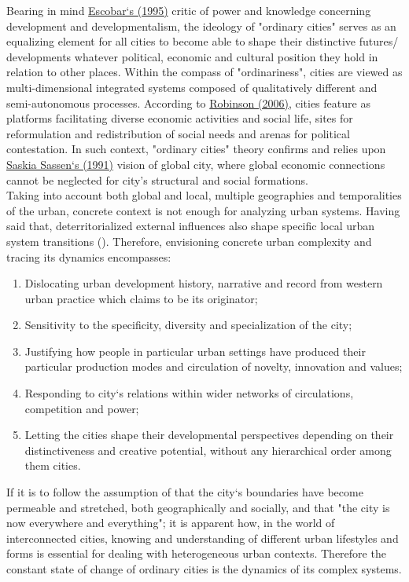 \documentclass[11pt]{report}
\begin{document}
Bearing  in  mind  \href{Escobar}{Escobar‘s (1995)} critic  of  power  and  knowledge  concerning  development  and developmentalism, the  ideology  of  "ordinary  cities"  serves as an equalizing  element  for  all  cities  to  become  able  to  shape  their  distinctive  futures/  developments whatever political, economic and cultural position they hold in relation to other places. 
Within  the  compass  of  "ordinariness",  cities are viewed  as  multi-dimensional  integrated  systems composed of qualitatively different and semi-autonomous processes.
According to  \href{Robinson}{Robinson (2006)}, cities feature as  platforms facilitating  diverse  economic  activities  and  social  life,  sites for  reformulation  and redistribution of social needs and arenas for political contestation.
In such context, "ordinary cities" theory confirms and relies upon \href{Sassen}{Saskia Sassen‘s (1991)}  vision of global city, where global economic connections cannot be neglected for city's structural  and  social  formations.
\\

Taking into account both global and local, multiple geographies and temporalities of the urban, concrete context is not enough for analyzing urban systems.
Having said that, deterritorialized external influences also shape specific local urban system transitions (\href{Robinson}{\cite{Robinson_2013}}).
Therefore, envisioning concrete urban complexity and tracing its dynamics encompasses:

\begin{enumerate}
\item Dislocating urban development history, narrative and record from western urban practice which claims to be its originator;
\item Sensitivity to the specificity, diversity and specialization of the city;
\item Justifying how  people  in particular urban settings  have  produced their  particular  production modes and circulation of novelty, innovation and values;
\item Responding to city‘s relations within wider networks of circulations, competition and power; 
\item Letting the  cities  shape their developmental perspectives depending  on  their  distinctiveness  and creative potential, without any hierarchical order among them cities.
\end{enumerate}

If it is to follow the assumption of \href{Amin}{\cite{Amin_Globalization_1996}} that the city‘s boundaries have become permeable and stretched, both geographically and socially, and that "the city is  now  everywhere  and  everything";  it  is  apparent  how,  in  the  world  of interconnected cities, knowing and understanding of different urban lifestyles and forms is essential for dealing with heterogeneous urban contexts.
Therefore the constant state of change of ordinary cities is the dynamics  of its complex systems. 
\\
\end{document}
